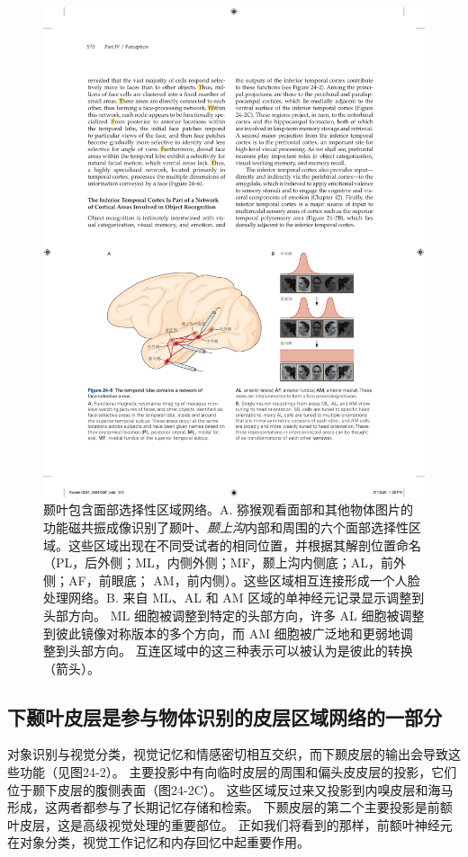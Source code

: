 \begin{figure}[htbp]
	\centering
	\includegraphics[width=0.9\linewidth]{chap24/fig_24_6}
	\caption{颞叶包含面部选择性区域网络。A. 猕猴观看面部和其他物体图片的功能磁共振成像识别了颞叶、\textit{颞上沟}内部和周围的六个面部选择性区域。这些区域出现在不同受试者的相同位置，并根据其解剖位置命名（PL，后外侧；ML，内侧外侧；MF，颞上沟内侧底；AL，前外侧；AF，前眼底； AM，前内侧）。这些区域相互连接形成一个人脸处理网络。B. 来自 ML、AL 和 AM 区域的单神经元记录显示调整到头部方向。 ML 细胞被调整到特定的头部方向，许多 AL 细胞被调整到彼此镜像对称版本的多个方向，而 AM 细胞被广泛地和更弱地调整到头部方向。 互连区域中的这三种表示可以被认为是彼此的转换（箭头）。}
	\label{fig:24_6}
\end{figure}



\subsection{下颞叶皮层是参与物体识别的皮层区域网络的一部分}

对象识别与视觉分类，视觉记忆和情感密切相互交织，而下颞皮层的输出会导致这些功能（见图24-2）。
主要投影中有向临时皮层的周围和偏头皮皮层的投影，它们位于颞下皮层的腹侧表面（图24-2C）。
这些区域反过来又投影到内嗅皮层和海马形成，这两者都参与了长期记忆存储和检索。
下颞皮层的第二个主要投影是前额叶皮层，这是高级视觉处理的重要部位。
正如我们将看到的那样，前额叶神经元在对象分类，视觉工作记忆和内存回忆中起重要作用。



